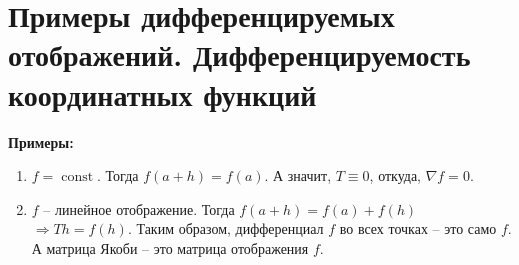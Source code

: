 \section{Примеры дифференцируемых отображений. Дифференцируемость координатных функций}

\textbf{Примеры:}
\begin{enumerate}
    \item $f = \operatorname{const}$. Тогда $f(a + h) = f(a)$.
    А значит, $T \equiv 0$, откуда, $\nabla f = 0$.
    \item $f$ -- линейное отображение. Тогда $f(a + h) = f(a) + f(h)$
    $\Rightarrow Th = f(h)$. Таким образом, дифференциал $f$ во всех
    точках -- это само $f$.
    А матрица Якоби -- это матрица отображения $f$.
\end{enumerate}

